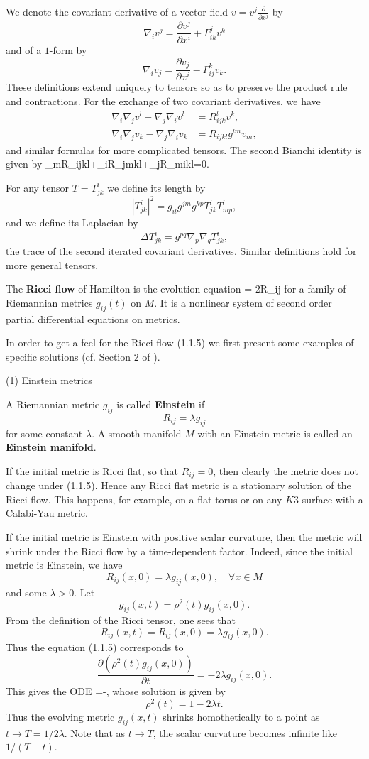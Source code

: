 We denote the covariant derivative of a vector field
$v=v^j\frac{\partial}{\partial x^j}$ by
$$
\nabla_iv^j=\frac{\partial v^j}{\partial x^i}+\Gamma^j_{ik}v^k
$$
and of a $1$-form by
$$
\nabla_iv_j=\frac{\partial v_j}{\partial x^i}-\Gamma^k_{ij}v_k.
$$
These definitions extend uniquely to tensors so as to preserve the
product rule and contractions. For the exchange of two covariant
derivatives, we have
\begin{align}
\nabla_i\nabla_jv^l-\nabla_j\nabla_iv^l&=R^l_{ijk}v^k,\\
\nabla_i\nabla_jv_k-\nabla_j\nabla_iv_k&=R_{ijkl}g^{lm}v_m,
\end{align}
and similar formulas for more complicated tensors.
 The second Bianchi identity is given by
\be \nabla_mR_{ijkl}+\nabla_iR_{jmkl}+\nabla_jR_{mikl}=0.
\ee

For any tensor $T=T^i_{jk}$ we define its length by
$$
|T^i_{jk}|^2=g_{il}g^{jm}g^{kp}T^i_{jk}T^l_{mp},
$$
and we define its Laplacian by
$$
\Delta T^i_{jk}=g^{pq}\nabla_p\nabla_qT^i_{jk},
$$
the trace of the second iterated covariant derivatives. Similar
definitions hold for more general tensors.

The {\bf Ricci flow} of Hamilton \cite{Ha82} is
the evolution equation \be
{}=-2R_{ij} %
\ee for a family of Riemannian metrics $g_{ij}(t)$ on $M$. It is a
nonlinear system of second order partial differential equations on
metrics.

In order to get a feel for the Ricci flow (1.1.5) we first present
some examples of specific solutions (cf. Section 2 of
\cite{Ha95F}). \vskip 0.2cm

(1) Einstein metrics \vskip 0.1cm

A Riemannian metric $g_{ij}$ is called {\bf
Einstein} if
$$
R_{ij}=\lambda g_{ij}
$$
for some constant $\lambda$. A smooth manifold $M$ with an
Einstein metric is called an {\bf Einstein
manifold}.

If the initial metric is Ricci flat, so that $R_{ij}=0$, then
clearly the metric does not change under (1.1.5). Hence any Ricci
flat metric is a stationary solution of the Ricci flow. This
happens, for example, on a flat torus or on any $K3$-surface with
a Calabi-Yau metric.

If the initial metric is Einstein with positive scalar curvature,
then the metric will shrink under the Ricci flow by a
time-dependent factor. Indeed, since the initial metric is
Einstein, we have
$$
R_{ij}(x,0)=\lambda g_{ij}(x,0), \quad \forall x\in M
$$
and some $\lambda>0$. Let
$$
g_{ij}(x,t)=\rho^2(t)g_{ij}(x,0).
$$
{}From the definition of the Ricci tensor, one sees that
$$
R_{ij}(x,t)=R_{ij}(x,0)=\lambda g_{ij}(x,0).
$$
Thus the equation (1.1.5) corresponds to
$$
\frac{\partial (\rho^2(t) g_{ij}(x,0))}{\partial t}=-2\lambda
g_{ij}(x,0).
$$
This gives the ODE \be
{}=-\frac{\lambda}{\rho}, %
\ee whose solution is given by
$$
\rho^2(t)=1-2\lambda t.
$$
Thus the evolving metric $g_{ij}(x,t)$ shrinks homothetically to a
point as $t\rightarrow T=1/{2\lambda}$. Note that as $t\rightarrow
T$, the scalar curvature becomes infinite like $1/(T-t)$.

